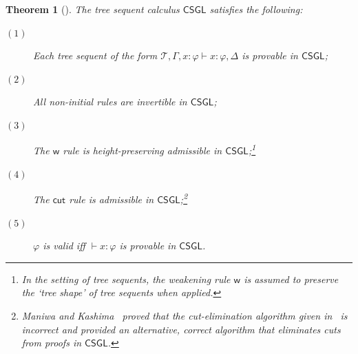 \documentclass[copyright,creativecommons]{eptcs}
\newtheorem{theorem}{Theorem}[section]
\newcommand{\treegl}{\mathsf{CSGL}}
\newcommand{\tel}{\mathcal{T}}
\newcommand{\iffi}{\textit{iff} }
\renewcommand{\phi}{\varphi}
\newcommand{\wk}{\mathsf{w}}
\newcommand{\ctrl}{\mathsf{cL}}
\newcommand{\ctrr}{\mathsf{cR}}
\newcommand{\lsub}{(x/y)}
\newcommand{\ru}{\mathsf{r}}
\newcommand{\cut}{\mathsf{cut}}
\newcommand{\calc}{\mathsf{CSGL}}
\newcommand{\sar}{\vdash}
\newcommand{\fig}{Figure} %
\newcommand{\set}[1]{\{#1\}}
\begin{document}




\begin{theorem}[\cite{ManKas24,Pog09b}]\label{thm:tree-seq-properties} The tree sequent calculus $\treegl$ satisfies the following:
\begin{description}

\item[$(1)$] Each tree sequent of the form $\tel, \Gamma, x : \phi \sar x : \phi, \Delta$ is provable in $\treegl$;

\item[$(2)$] All non-initial rules are invertible in $\treegl$;%

\item[$(3)$] The $\wk$ rule is height-preserving admissible in $\treegl$;\footnote{In the setting of tree sequents, the weakening rule $\wk$ is assumed to preserve the `tree shape' of tree sequents when applied.} %

\item[$(4)$] The $\cut$ rule is admissible in $\treegl$;\footnote{Maniwa and Kashima~\cite{ManKas24} proved that the cut-elimination algorithm given in~\cite{Pog09b} is incorrect and provided an alternative, correct algorithm that eliminates cuts from proofs in $\calc$.}

\item[$(5)$] $\phi$ is valid \iffi $\sar x : \phi$ is provable in $\treegl$.

\end{description}
\end{theorem}
\end{document}
